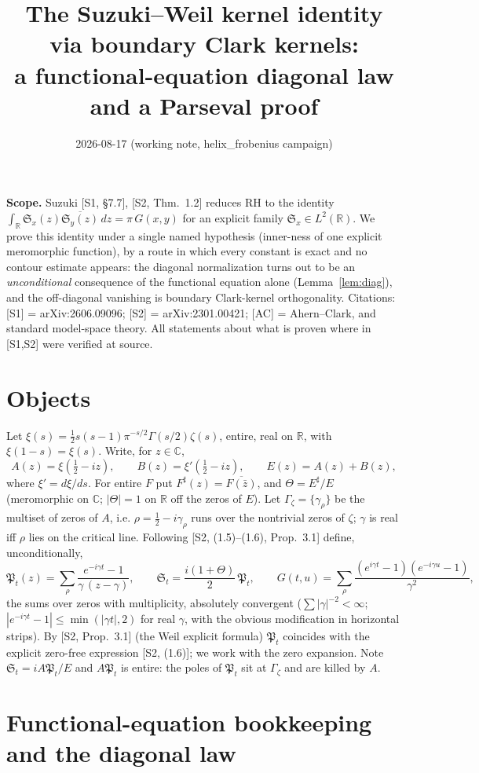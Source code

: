 \documentclass[11pt]{article}
\title{The Suzuki--Weil kernel identity via boundary Clark kernels:\\
a functional-equation diagonal law and a Parseval proof}
\author{}
\date{2026-08-17 (working note, helix\_frobenius campaign)}
\newcommand{\C}{\mathbb{C}}
\newcommand{\R}{\mathbb{R}}
\newcommand{\Th}{\Theta}
\newcommand{\Sfr}{\mathfrak{S}}
\newcommand{\Pfr}{\mathfrak{P}}
\begin{document}
\maketitle

\noindent\textbf{Scope.} Suzuki [S1, \S7.7], [S2, Thm.~1.2] reduces RH to the identity
$\int_\R \Sfr_x(z)\overline{\Sfr_y(z)}\,dz=\pi\,G(x,y)$ for an explicit family
$\Sfr_x\in L^2(\R)$. We prove this identity under a single named hypothesis
(inner-ness of one explicit meromorphic function), by a route in which every
constant is exact and no contour estimate appears: the diagonal normalization
turns out to be an \emph{unconditional} consequence of the functional equation
alone (Lemma~\ref{lem:diag}), and the off-diagonal vanishing is boundary
Clark-kernel orthogonality. Citations: [S1] = arXiv:2606.09096; [S2] =
arXiv:2301.00421; [AC] = Ahern--Clark, and standard model-space theory.
All statements about what is proven where in [S1,S2] were verified at source.

\section{Objects}
Let $\xi(s)=\tfrac12 s(s-1)\pi^{-s/2}\Gamma(s/2)\zeta(s)$, entire, real on $\R$,
with $\xi(1-s)=\xi(s)$. Write, for $z\in\C$,
\[ A(z)=\xi(\tfrac12-iz),\qquad B(z)=\xi'(\tfrac12-iz),\qquad E(z)=A(z)+B(z), \]
where $\xi'=d\xi/ds$. For entire $F$ put $F^\sharp(z)=\overline{F(\bar z)}$, and
$\Th=E^\sharp/E$ (meromorphic on $\C$; $|\Th|=1$ on $\R$ off the zeros of $E$).
Let $\Gamma_\zeta=\{\gamma_\rho\}$ be the multiset of zeros of $A$, i.e.
$\rho=\tfrac12-i\gamma_\rho$ runs over the nontrivial zeros of $\zeta$; $\gamma$
is real iff $\rho$ lies on the critical line. Following [S2, (1.5)--(1.6),
Prop.~3.1] define, unconditionally,
\[
\Pfr_t(z)=\sum_{\rho}\frac{e^{-i\gamma t}-1}{\gamma\,(z-\gamma)},\qquad
\Sfr_t=\frac{i(1+\Th)}{2}\,\Pfr_t,\qquad
G(t,u)=\sum_{\rho}\frac{(e^{i\gamma t}-1)(e^{-i\gamma u}-1)}{\gamma^{2}},
\]
the sums over zeros with multiplicity, absolutely convergent
($\sum|\gamma|^{-2}<\infty$; $|e^{-i\gamma t}-1|\le\min(|\gamma t|,2)$ for real
$\gamma$, with the obvious modification in horizontal strips). By [S2,
Prop.~3.1] (the Weil explicit formula) $\Pfr_t$ coincides with the explicit
zero-free expression [S2, (1.6)]; we work with the zero expansion. Note
$\Sfr_t=iA\Pfr_t/E$ and $A\Pfr_t$ is entire: the poles of $\Pfr_t$ sit at
$\Gamma_\zeta$ and are killed by $A$.

\section{Functional-equation bookkeeping and the diagonal law}
\end{document}
